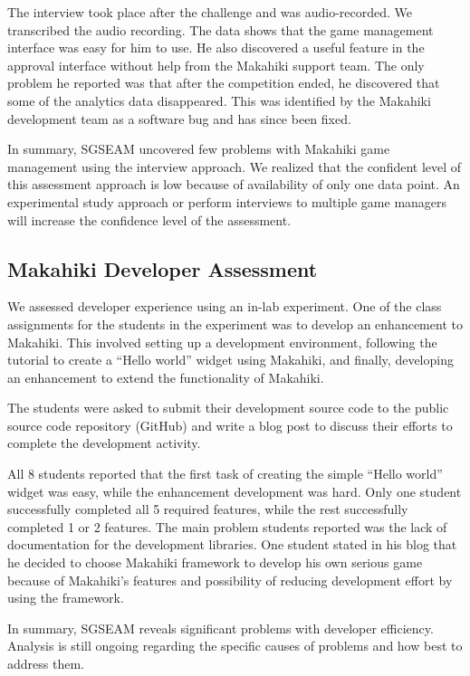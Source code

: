 \documentclass{sigchi}
\begin{document}
The interview took place after the challenge and was audio-recorded. We transcribed the
audio recording. The data shows that the game management interface was easy for him to use.
He also discovered a useful feature in the approval interface without
help from the Makahiki support team. The only problem he reported was that after the
competition ended, he discovered that some of the analytics data disappeared. This was
identified by the Makahiki development team as a software bug and has since been fixed.

In summary, SGSEAM uncovered few problems with Makahiki game management using the interview
approach. We realized that the confident level of this assessment approach is low because of
 availability of only one data point. An experimental study approach or perform interviews to
multiple game managers will increase the confidence level of the assessment.

\subsection{Makahiki Developer Assessment}

We assessed developer experience using an in-lab experiment. One of the class assignments
for the students in the experiment was to develop an enhancement to Makahiki.  This
involved setting up a development environment, following the tutorial to create a ``Hello
world'' widget using Makahiki, and finally, developing an enhancement to extend the
functionality of Makahiki.

The students were asked to submit their development source code to the
public source code repository (GitHub) and write a blog post to
discuss their efforts to complete the development activity.

All 8 students reported that the first task of creating the simple ``Hello world'' widget
was easy, while the enhancement development was hard. Only one student successfully
completed all 5 required features, while the rest successfully completed 1 or 2
features. The main problem students reported was the lack of documentation for the
development libraries. One student stated in his blog that he decided to choose Makahiki
framework to develop his own serious game because of Makahiki's features and possibility
of reducing development effort by using the framework.

In summary, SGSEAM reveals significant problems with developer efficiency.
Analysis is still ongoing regarding the specific causes of problems and how best to
address them.
\end{document}
